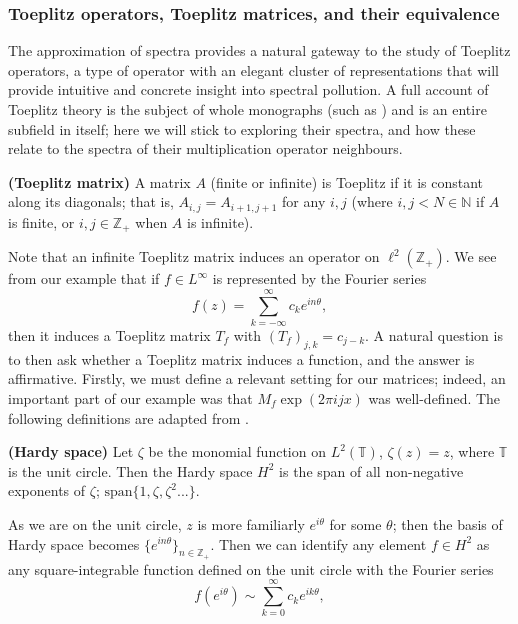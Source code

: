 \documentclass[../main.tex]{subfiles}
\begin{document}
\subsubsection{Toeplitz operators, Toeplitz matrices, and their equivalence}

The approximation of spectra provides a natural gateway to the study of Toeplitz operators, a type of operator with an elegant cluster
of representations that will provide intuitive and concrete insight into spectral pollution. A full account of Toeplitz theory is the subject
of whole monographs (such as \parencite{bottcher1990analysis}) and is an entire subfield in itself;
here we will stick to exploring their spectra, and how these relate to the spectra of their multiplication operator neighbours. 

\begin{definition}{\textbf{(Toeplitz matrix)}}
A matrix $A$ (finite or infinite) is Toeplitz if it is constant along its diagonals; that is, $A_{i,j} = A_{i+1,j+1}$
for any $i, j$ (where $i,j < N \in \mathbb{N}$ if $A$ is finite, or $i,j \in \mathbb{Z}_+$ when $A$ is infinite).
\end{definition}

Note that an infinite Toeplitz matrix induces an operator on $\ell^2(\mathbb{Z}_+)$.
We see from our example that if $f \in L^\infty$ is represented by the Fourier series
$$f(z) = \sum_{k=-\infty}^{\infty} c_k e^{i n \theta},$$
then it induces a Toeplitz matrix $T_f$ with $(T_f)_{j,k} = c_{j-k}$.
A natural question is to then ask whether a Toeplitz matrix induces a function, and the answer is affirmative. Firstly, we must define a relevant setting for our matrices; indeed, an important part of our
example was that $M_f \exp(2 \pi i j x)$ was well-defined. The following definitions are adapted from \parencite{arveson2002short}.

\begin{definition}{\textbf{(Hardy space)}}
Let $\zeta$ be the monomial function on $L^2(\mathbb{T})$, $\zeta(z) = z$, where $\mathbb{T}$ is the unit circle. Then the
Hardy space $H^2$ is the span of all non-negative exponents of $\zeta$; $\text{span}\{1, \zeta, \zeta^2...\}$.
\end{definition}

As we are on the unit circle, $z$ is more familiarly $e^{i \theta}$ for some $\theta$; then the basis of Hardy space becomes $\{e^{i n \theta}\}_{n \in \mathbb{Z}_+}$. Then we can identify any element $f \in H^2$ as any square-integrable function defined on the unit circle with the Fourier series 
$$f(e^{i \theta}) \sim \sum_{k=0}^\infty c_k e^{i k \theta},$$
\end{document}

